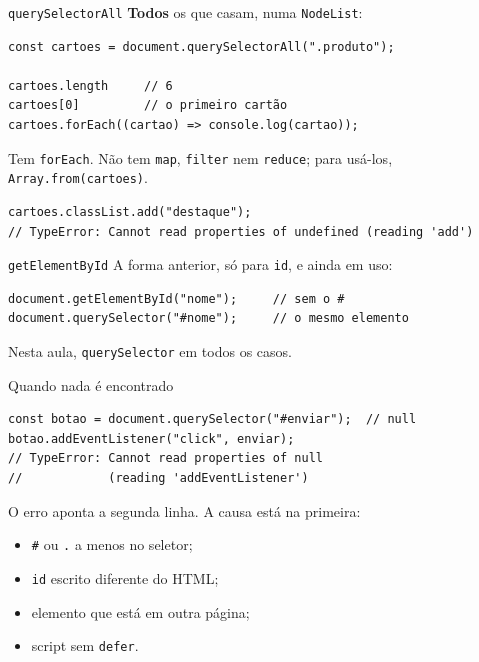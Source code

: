 \documentclass{beamer}
\begin{document}
\begin{frame}[fragile]{\texttt{querySelectorAll}}
	\textbf{Todos} os que casam, numa \texttt{NodeList}:

	\begin{verbatim}
const cartoes = document.querySelectorAll(".produto");

cartoes.length     // 6
cartoes[0]         // o primeiro cartão
cartoes.forEach((cartao) => console.log(cartao));
	\end{verbatim}

	\vspace{0.2cm}
	Tem \texttt{forEach}. Não tem \texttt{map}, \texttt{filter} nem
	\texttt{reduce}; para usá-los, \texttt{Array.from(cartoes)}.

	\begin{verbatim}
cartoes.classList.add("destaque");
// TypeError: Cannot read properties of undefined (reading 'add')
	\end{verbatim}
\end{frame}

\begin{frame}[fragile]{\texttt{getElementById}}
	A forma anterior, só para \texttt{id}, e ainda em uso:

	\begin{verbatim}
document.getElementById("nome");     // sem o #
document.querySelector("#nome");     // o mesmo elemento
	\end{verbatim}

	\vspace{0.3cm}
	Nesta aula, \texttt{querySelector} em todos os casos.
\end{frame}

\begin{frame}[fragile]{Quando nada é encontrado}
	\begin{verbatim}
const botao = document.querySelector("#enviar");  // null
botao.addEventListener("click", enviar);
// TypeError: Cannot read properties of null
//            (reading 'addEventListener')
	\end{verbatim}

	\vspace{0.2cm}
	O erro aponta a segunda linha. A causa está na primeira:
	\begin{itemize}
		\item \texttt{\#} ou \texttt{.} a menos no seletor;
		\item \texttt{id} escrito diferente do HTML;
		\item elemento que está em outra página;
		\item script sem \texttt{defer}.
	\end{itemize}
\end{frame}
\end{document}
